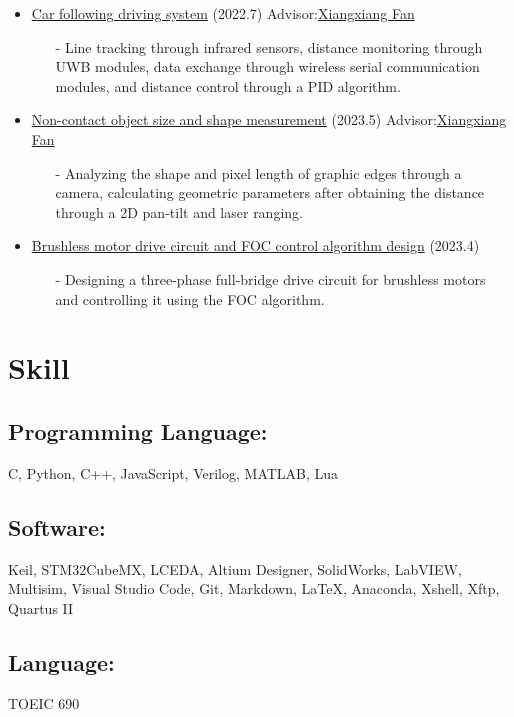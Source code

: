 \documentclass{article}
\begin{document}
\begin{itemize}
    \item \href{https://resume.uint16kun.com/my-projects/Car%20following%20driving%20system.html}{Car following driving system} (2022.7)     Advisor:\href{https://xxgcxy.zjhu.edu.cn/2021/0326/c5544a166633/page.htm}{Xiangxiang Fan}
          \begin{itemize}
              \item[-] Line tracking through infrared sensors, distance monitoring through UWB modules, data exchange through wireless serial communication modules, and distance control through a PID algorithm.
          \end{itemize}
    \item \href{https://resume.uint16kun.com/my-projects/Non-contact%20object%20size%20and%20shape%20measurement.html}{Non-contact object size and shape measurement} (2023.5)     Advisor:\href{https://xxgcxy.zjhu.edu.cn/2021/0326/c5544a166633/page.htm}{Xiangxiang Fan}
          \begin{itemize}
              \item[-] Analyzing the shape and pixel length of graphic edges through a camera, calculating geometric parameters after obtaining the distance through a 2D pan-tilt and laser ranging.
          \end{itemize}
    \item \href{https://resume.uint16kun.com/my-projects/Brushless%20motor%20drive%20circuit%20and%20FOC%20control%20algorithm%20design.html}{Brushless motor drive circuit and FOC control algorithm design} (2023.4)
          \begin{itemize}
              \item[-] Designing a three-phase full-bridge drive circuit for brushless motors and controlling it using the FOC algorithm.
          \end{itemize}
\end{itemize}

\section*{Skill}
\subsection*{Programming Language:}
C, Python, C++, JavaScript, Verilog, MATLAB, Lua

\subsection*{Software:}
Keil, STM32CubeMX, LCEDA, Altium Designer, SolidWorks, LabVIEW, Multisim, Visual Studio Code, Git, Markdown, LaTeX, Anaconda, 
Xshell, Xftp, Quartus II
\subsection*{Language:}
TOEIC 690
\end{document}
